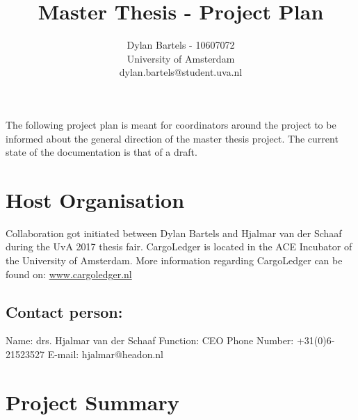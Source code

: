 \documentclass[11pt]{article}
\begin{document}
\title{Master Thesis - Project Plan}
\author{Dylan Bartels - 10607072\\University of Amsterdam \\dylan.bartels@student.uva.nl}
\maketitle

The following project plan is meant for coordinators around the project to be informed about the general direction of the master thesis project. The current state of the documentation is that of a draft.

\section{Host Organisation}
Collaboration got initiated between Dylan Bartels and Hjalmar van der Schaaf during the UvA 2017 thesis fair. CargoLedger is located in the ACE Incubator of the University of Amsterdam. More information regarding CargoLedger can be found on: \url{www.cargoledger.nl}

\subsection*{Contact person: }

Name: \hspace{16mm} drs. Hjalmar van der Schaaf \newline
Function: \hspace{11mm} CEO\newline
Phone Number: \hspace{0.5mm} +31(0)6-21523527\newline
E-mail: \hspace{15mm} hjalmar@headon.nl \newline

\section{Project Summary}
\end{document}
